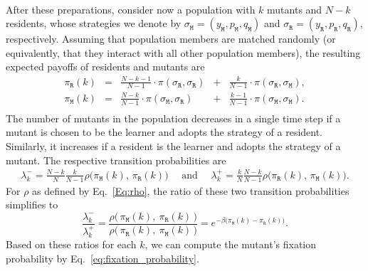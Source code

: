\documentclass[11pt]{article}
\def\resident{\texttt{R}}
\def\mutant{\texttt{M}}
\def\strategy{\texttt{$\sigma$}}
\theoremstyle{plainCl1}
\theoremstyle{plainCl2}
\begin{document}
~\\
\noindent
After these preparations, consider now a population with \(k\) mutants and \(N - k\) residents, whose strategies we denote by \(\strategy_\mutant=(y_\mutant,p_\mutant, q_\mutant)\) and \(\strategy_\resident = (y_\resident, p_\resident, q_\resident)\), respectively.
Assuming that population members are matched randomly (or equivalently, that they interact with all other population members), the resulting expected payoffs of residents and mutants are
\begin{equation} \label{Eq:ExpPay}
  \begin{array}{lcrcr}
  \displaystyle \pi_\resident(k)& = &\displaystyle \frac{N\!-\!k\!-\!1}{N-1}\cdot \pi(\strategy_\resident,\strategy_\resident)	&+	&\displaystyle\frac{k}{N-1}\cdot \pi(\strategy_\resident,\strategy_\mutant),\\[0.5cm]
  \displaystyle \pi_\mutant(k)& = &\displaystyle\frac{N-k}{N-1}\cdot \pi(\strategy_\mutant,\strategy_\resident) &+	&\displaystyle\frac{k-1}{N-1}\cdot \pi(\strategy_\mutant,\strategy_\mutant).\\
  \end{array}
\end{equation}
The number of mutants in the population decreases in a single time step if a mutant is chosen to be the learner and adopts the strategy
of a resident. 
Similarly, it increases if a resident is the learner and adopts the strategy of a mutant. 
The respective transition probabilities are 
\begin{align*}
  \lambda^-_k \!=\! \frac{N-k}{N}\frac{k}{N-1}\rho\big(\pi_\mutant(k),\,\pi_\resident(k)\big) \quad \text{ and } \quad \lambda^+_k \!=\!\frac{k}{N}\frac{N-k}{N-1}\rho\big(\pi_\resident(k),\,\pi_\mutant(k)\big).
\end{align*}
For $\rho$ as defined by Eq.~\eqref{Eq:rho}, the ratio of these two transition probabilities simplifies to 
\begin{equation} \label{eq:LambdaRatio}
 \frac{\lambda^-_k}{\lambda^+_k} \!=\!  \frac{\rho\big(\,\pi_\mutant(k),~\pi_\resident(k)\,\big)}{\rho\big(\,\pi_\resident(k),~\pi_\mutant(k)\,\big)} 
 =e^{-\beta\big(\pi_\mutant(k)-\pi_\resident(k)\big)}.
\end{equation}
Based on these ratios for each $k$, we can compute the mutant's fixation probability by Eq.~\eqref{eq:fixation_probability}. 

\end{document}
